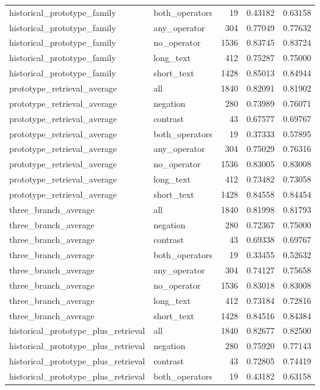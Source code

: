 \begin{tabular}{llrrr}
historical_prototype_family & both_operators & 19 & 0.43182 & 0.63158 \\
historical_prototype_family & any_operator & 304 & 0.77049 & 0.77632 \\
historical_prototype_family & no_operator & 1536 & 0.83745 & 0.83724 \\
historical_prototype_family & long_text & 412 & 0.75287 & 0.75000 \\
historical_prototype_family & short_text & 1428 & 0.85013 & 0.84944 \\
prototype_retrieval_average & all & 1840 & 0.82091 & 0.81902 \\
prototype_retrieval_average & negation & 280 & 0.73989 & 0.76071 \\
prototype_retrieval_average & contrast & 43 & 0.67577 & 0.69767 \\
prototype_retrieval_average & both_operators & 19 & 0.37333 & 0.57895 \\
prototype_retrieval_average & any_operator & 304 & 0.75029 & 0.76316 \\
prototype_retrieval_average & no_operator & 1536 & 0.83005 & 0.83008 \\
prototype_retrieval_average & long_text & 412 & 0.73482 & 0.73058 \\
prototype_retrieval_average & short_text & 1428 & 0.84558 & 0.84454 \\
three_branch_average & all & 1840 & 0.81998 & 0.81793 \\
three_branch_average & negation & 280 & 0.72367 & 0.75000 \\
three_branch_average & contrast & 43 & 0.69338 & 0.69767 \\
three_branch_average & both_operators & 19 & 0.33455 & 0.52632 \\
three_branch_average & any_operator & 304 & 0.74127 & 0.75658 \\
three_branch_average & no_operator & 1536 & 0.83018 & 0.83008 \\
three_branch_average & long_text & 412 & 0.73184 & 0.72816 \\
three_branch_average & short_text & 1428 & 0.84516 & 0.84384 \\
historical_prototype_plus_retrieval & all & 1840 & 0.82677 & 0.82500 \\
historical_prototype_plus_retrieval & negation & 280 & 0.75920 & 0.77143 \\
historical_prototype_plus_retrieval & contrast & 43 & 0.72805 & 0.74419 \\
historical_prototype_plus_retrieval & both_operators & 19 & 0.43182 & 0.63158 \\

\end{tabular}
